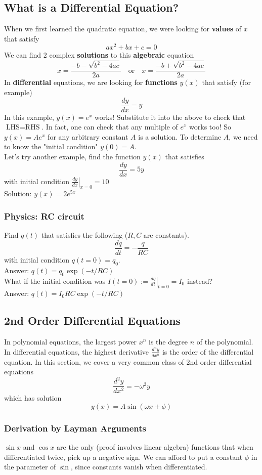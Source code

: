 \documentclass{article}
\begin{document}
\subsection{What is a Differential Equation?}
When we first learned the quadratic equation, we were looking for \textbf{values} of $x$ that satisfy $$ax^2 + bx + c = 0$$  We can find 2 complex \textbf{solutions} to this \textbf{algebraic} equation
$$x = \frac{-b - \sqrt{b^2 - 4ac}}{2a} \quad \text{or}\quad x = \frac{-b + \sqrt{b^2 - 4ac}}{2a}$$
In \textbf{differential} equations, we are looking for \textbf{functions} $y(x)$ that satisfy (for example)
$$\frac{dy}{dx} = y$$
In this example, $y(x) = e^x$ works! Substitute it into the above to check that $\text{LHS} = \text{RHS}$. In fact, one can check that any multiple of $e^x$ works too! So $y(x) = A e^x$ for any arbitrary constant $A$ is a solution. To determine $A$, we need to know the "initial condition" $y(0) = A$.
\\[10pt]
Let's try another example, find the function $y(x)$ that satisfies 
$$\frac{dy}{dx} = 5y$$ with initial condition $\left. \frac{dy}{dx} \right|_{x=0} = 10$\\
Solution: $y(x) = 2e^{5x}$
\subsubsection{Physics: RC circuit} 
Find $q(t)$ that satisfies the following ($R,C$ are constants).
$$\frac{dq}{dt} = -\frac{q}{RC}$$ with initial condition $q(t=0) = q_0$. \\Answer: $q(t) = q_0 \exp (-t/RC)$ \\[10pt]
What if the initial condition was $I(t=0) := \left. \frac{dq}{dt} \right|_{t=0} = I_0$ instead? \\ Answer: $q(t) = {I_0 RC} \exp (-t/RC)$\\[10pt]

\subsection{2nd Order Differential Equations}
In polynomial equations, the largest power $x^n$ is the degree $n$ of the polynomial. In differential equations, the highest derivative $\frac{d^n y}{dx^n}$ is the order of the differential equation. In this section, we cover a very common class of 2nd order differential equations
$$\frac{d^2 y}{dx^2} = -\omega^2 y$$
which has solution
$$y(x) = A\sin(\omega x + \phi)$$
\subsubsection{Derivation by Layman Arguments}
$\sin x$ and $\cos x$ are the only (proof involves linear algebra) functions that when differentiated twice, pick up a negative sign. We can afford to put a constant $\phi$ in the parameter of $\sin$, since constants vanish when differentiated. 
\end{document}
